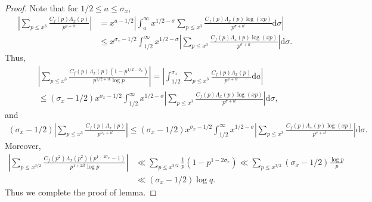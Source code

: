 \documentclass[11pt,reqno]{amsart}
\numberwithin{equation}{section}
\theoremstyle{plain}
\theoremstyle{definition}
\begin{document}
\begin{proof}
Note that for $1/2\leq a\leq \sigma_x$,
\begin{equation*}
\begin{split}
\left|\sum_{p\leq x^3} \frac{C_f(p)\Lambda_x(p)}{p^{a+it}}\right|
&=x^{a-1/2}\left|\int_a^\infty x^{1/2-\sigma}\sum_{p\leq x^3}
\frac{C_f(p)\Lambda_x(p)\log(xp)}{p^{\sigma+it}}\mathrm{d}\sigma\right|\\
&\leq x^{\sigma_x-1/2}\int_{1/2}^\infty x^{1/2-\sigma}\left|\sum_{p\leq x^3}
\frac{C_f(p)\Lambda_x(p)\log(xp)}{p^{\sigma+it}}\right|\mathrm{d}\sigma.
\end{split}
\end{equation*}
Thus,
\begin{equation*}
\begin{split}
&\left|\sum_{p\leq x^3}
\frac{C_f(p)\Lambda_x(p)(1-p^{1/2-\sigma_x})}{p^{1/2+it}\log p}\right|
=\left|\int_{1/2}^{\sigma_x} \sum_{p\leq x^3} \frac{C_f(p)\Lambda_x(p)}{p^{a+it}}\mathrm{d}a\right|\\
&\leq (\sigma_x-1/2)x^{\sigma_x-1/2}\int_{1/2}^\infty x^{1/2-\sigma}\left|\sum_{p\leq x^3}
\frac{C_f(p)\Lambda_x(p)\log(xp)}{p^{\sigma+it}}\right|\mathrm{d}\sigma,
\end{split}
\end{equation*}
and
\begin{equation*}
\begin{split}
(\sigma_x-1/2)\left|\sum_{p\leq x^3} \frac{C_f(p)
\Lambda_x(p)}{p^{\sigma_x+it}}\right|\leq (\sigma_x-1/2)x^{\sigma_x-1/2}\int_{1/2}^\infty
x^{1/2-\sigma}\left|\sum_{p\leq x^3}
\frac{C_f(p)\Lambda_x(p)\log(xp)}{p^{\sigma+it}}\right|\mathrm{d}\sigma.
\end{split}
\end{equation*}
Moreover,
\begin{equation*}
\begin{split}
\left|\sum_{p\leq x^{3/2}}\frac{C_f(p^2)\Lambda_x(p^2)(p^{1-2\sigma_x}-1)}{p^{1+2it}\log p}\right|
&\ll \sum_{p\leq x^{3/2}}\frac{1}{p}(1-p^{1-2\sigma_x})\ll \sum_{p\leq x^{3/2}}(\sigma_x-1/2)\frac{\log p}{p}\\
&\ll(\sigma_x-1/2)\log q.
\end{split}
\end{equation*}
Thus we complete the proof of lemma.
\end{proof}
\end{document}

